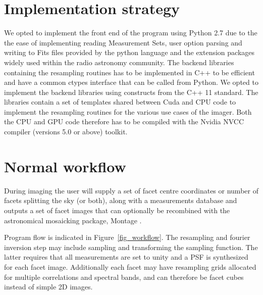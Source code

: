 \section{Implementation strategy}
We opted to implement the front end of the program using Python 2.7 due to the the ease of implementing reading Measurement Sets, user option parsing and writing to Fits files provided by the python language and
the extension packages widely used within the radio astronomy community. The backend libraries containing the resampling routines has to be implemented in C++ to be efficient and have a common ctypes interface 
that can be called from Python. We opted to implement the backend libraries using constructs from the C++ 11 standard. The libraries contain a set of
templates shared between Cuda and CPU code to implement the resampling routines for the various use cases of the imager. Both the CPU and GPU code therefore
has to be compiled with the Nvidia NVCC compiler (versions 5.0 or above) toolkit.

\section{Normal workflow}
During imaging the user will supply a set of facet centre coordinates or number of facets splitting the sky (or both), along with a measurements database and outputs a set of facet images that can optionally
be recombined with the astronomical mosaicking package, Montage \cite{jacob2004montage}.

Program flow is indicated in Figure~\ref{fig_workflow}. The resampling and fourier inversion step may include sampling and transforming the sampling function.
The latter requires that all measurements are set to unity and a PSF is synthesized for each facet image. Additionally 
each facet may have resampling grids allocated for multiple correlations and spectral bands, and can therefore be facet cubes 
instead of simple 2D images. 

